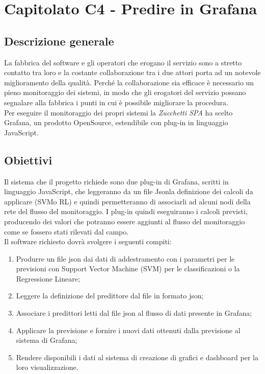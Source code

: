 \section{Capitolato C4 - Predire in Grafana}

\subsection{Descrizione generale}
La fabbrica del software e gli operatori che erogano il servizio sono a stretto contatto tra loro e la costante collaborazione tra i due attori porta ad un notevole miglioramento della qualità. Perché la collaborazione sia efficace è necessario un pieno monitoraggio dei sistemi, in modo che gli erogatori del servizio possano segnalare alla fabbrica i punti in cui è possibile migliorare la procedura. \\
Per eseguire il monitoraggio dei propri sistemi la \textit{Zucchetti SPA} ha scelto Grafana\glo, un prodotto OpenSource, estendibile con plug-in in linguaggio JavaScript.



\subsection{Obiettivi}
Il sistema che il progetto richiede sono due plug-in di Grafana, scritti in linguaggio JavaScript, che leggeranno da un file Json\glo la definizione dei calcoli da applicare (SVM\glo o RL\glo) e quindi permetteranno di associarli ad alcuni nodi della rete del flusso del monitoraggio. I plug-in quindi eseguiranno i calcoli previsti, producendo dei valori che potranno essere aggiunti al flusso del monitoraggio come se fossero stati rilevati dal campo.\\
Il software richiesto dovrà svolgere i seguenti compiti: \begin{enumerate}
\item Produrre un file json dai dati di addestramento con i parametri per le previsioni con Support Vector Machine (SVM) per le classificazioni o la Regressione Lineare;
\item Leggere la definizione del predittore dal file in formato json;
\item Associare i predittori letti dal file json al flusso di dati presente in Grafana;
\item Applicare la previsione e fornire i nuovi dati ottenuti dalla previsione al sistema di Grafana;
\item Rendere disponibili i dati al sistema di creazione di grafici e dashboard per la loro visualizzazione.
\end{enumerate}


